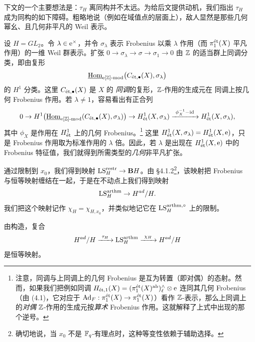 \begin{remark}
下文的一个主要想法是：$\tau_H$ 离同构并不太远。为给后文提供动机，我们指出 $\tau_H$ 成为同构的如下障碍。粗略地说（例如在域值点的层面上），敌人显然是那些几何幂幺、且几何非平凡的 Weil 表示。

设 $H = GL_2$。令 $\lambda \in \e^\times$，并令 $\sigma_\lambda$ 表示 Frobenius 以乘 $\lambda$ 作用（而 $\pi_1^{\et}(X)$ 平凡作用）的一维 Weil 群表示。扩张 $0 \to \sigma_\lambda \to \sigma \to \sigma_1 \to 0$ 由 $\ZZ$ 的适当群上同调分类，即由复形
\[
  \underline{\Hom}_{\e[\ZZ]\text{-}\mathrm{mod}}\bigl(C_{\et,\bullet}(X), \sigma_\lambda\bigr)
\]
的 $H^1$ 分类。这里 $C_{\et,\bullet}(X)$ 是 $X$ 的\emph{\et{} 同调}的复形，$\ZZ$-作用的生成元在 \et{} 同调上按几何 Frobenius 作用。若 $\lambda \neq 1$，容易看出有正合列
\[
  0 \to H^1\bigl(\underline{\Hom}_{\e[\ZZ]\text{-}\mathrm{mod}}(C_{\et,\bullet}(X),\sigma_\lambda)\bigr) \to H^1_{\et}(X,\sigma_\lambda) \xrightarrow{\ \phi_X^{-1}-\id\ } H^1_{\et}(X,\sigma_\lambda),
\]
其中 $\phi_X$ 是作用在 $H^1_{\et}$ 上的几何 Frobenius。\footnote{注意，同调与上同调上的几何 Frobenius 是互为转置（即对偶）的态射。然而，如果我们把例如同调 $H_{\et,1}(X) = (\pi_1^{\et}(X)^{\mathrm{ab}})^{\wedge}_\ell \otimes \e$ 连同其几何 Frobenius（由 (4.1)，它对应于 $\Ad_F : \pi_1^{\et}(X) \to \pi_1^{\et}(X)$）看作 $\ZZ$-表示，那么上同调上的\emph{对偶} $\ZZ$-作用的生成元按\emph{算术} Frobenius 作用。这就解释了上式中出现的那个逆号。} 这里 $H^1_{\et}(X,\sigma_\lambda) = H^1_{\et}(X,\e)$，只是 Frobenius 作用取为标准作用的 $\lambda$ 倍。因此，若 $\lambda$ 是出现在 $H^1_{\et}(X,\e)$ 中的 Frobenius 特征值，我们就得到所需类型的\emph{几何}非平凡扩张。
\end{remark}

通过限制到 $x_0$，我们得到映射 $\LS^{\restr}_H \to \mathbf{B}H$。由 §4.1.2\footnote{确切地说，当 $x_0$ 不是 $\F_q$-有理点时，这种等变性依赖于辅助选择。}，该映射把 Frobenius 与恒等映射缠结在一起，于是在不动点上我们得到映射
\[
  \LS^{\arthm}_H \to H^{ad}/H .
\]
我们把这个映射记作 $\chi_H = \chi_{H,x_0}$，并类似地记它在 $\LS^{\arthm,\circ}_H$ 上的限制。

由构造，复合
\[
  H^{ad}/H \xrightarrow{\ \tau_H\ } \LS^{\arthm}_H \xrightarrow{\ \chi_H\ } H^{ad}/H
\]
是恒等映射。
